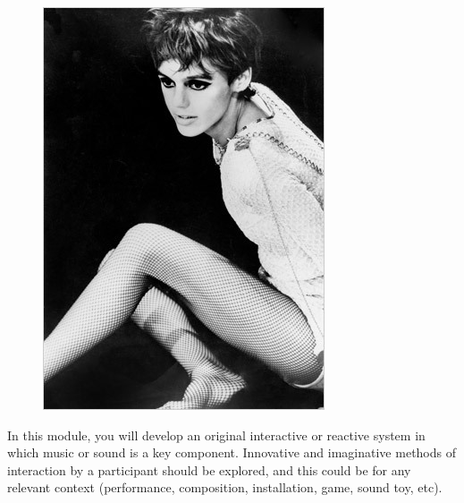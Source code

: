 \documentclass[]{article}
\begin{document}
\begin{appendices}
    \appendix
    \begin{landscape}
        \begin{figure}[h!]
            \includegraphics[width=\textwidth]{PLACEHOLDER.jpg}
        \end{figure}
    \end{landscape}
\end{appendices}







In this module, you will develop an original interactive or reactive system
in which music or sound is a key component. Innovative and imaginative
 methods of interaction by a participant should be explored, and this
  could be for any relevant context (performance, composition, installation,
   game, sound toy, etc).
   
\end{document}
